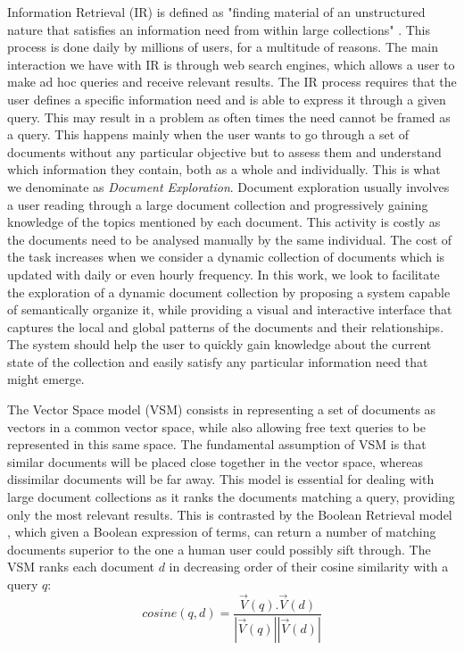 \documentclass[a4paper]{article}
\begin{document}
Information Retrieval (IR) is defined as "finding material of an unstructured nature that satisfies an information need from within large collections" \citep[p.~1]{schutze2008}. This process is done daily by millions of users, for a multitude of reasons. The main interaction we have with IR is through web search engines, which allows a user to make ad hoc queries and receive relevant results. The IR process requires that the user defines a specific information need and is able to express it through a given query. This may result in a problem as often times the need cannot be framed as a query. This happens mainly when the user wants to go through a set of documents without any particular objective but to assess them and understand which information they contain, both as a whole and individually. This is what we denominate as \textit{Document Exploration}. Document exploration usually involves a user reading through a large document collection and progressively gaining knowledge of the topics mentioned by each document. This activity is costly as the documents need to be analysed manually by the same individual. The cost of the task increases when we consider a dynamic collection of documents which is updated with daily or even hourly frequency. In this work, we look to facilitate the exploration of a dynamic document collection by proposing a system capable of semantically organize it, while providing a visual and interactive interface that captures the local and global patterns of the documents and their relationships. The system should help the user to quickly gain knowledge about the current state of the collection and easily satisfy any particular information need that might emerge.

The Vector Space model (VSM) \citep[p.~120-126]{schutze2008} consists in representing a set of documents as vectors in a common vector space, while also allowing free text queries to be represented in this same space. The fundamental assumption of VSM is that similar documents will be placed close together in the vector space, whereas dissimilar documents will be far away. This model is essential for dealing with large document collections as it ranks the documents matching a query, providing only the most relevant results. This is contrasted by the Boolean Retrieval model \citep[p.~1-18]{schutze2008}, which given a Boolean expression of terms, can return a number of matching documents superior to the one a human user could possibly sift through. The VSM ranks each document $d$ in decreasing order of their cosine similarity with a query $q$: 
\begin{equation}
	cosine(q,d) = \frac{\overrightarrow{V}(q).\overrightarrow{V}(d)}{|\overrightarrow{V}(q)||\overrightarrow{V}(d)|}
\end{equation}
\end{document}

